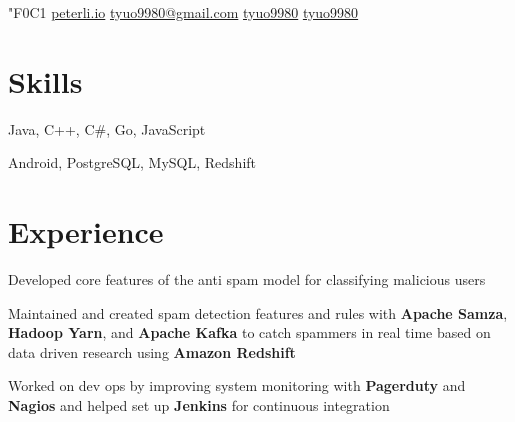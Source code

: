 \documentclass[]{peter_resume}
\begin{document}

{

   {\fa\char"F0C1} \href{http://peterli.io}{peterli.io}
     \href{mailto:tyuo9980@gmail.com}{tyuo9980@gmail.com}
     \href{https://github.com/tyuo9980}{tyuo9980}
     \href{https://www.linkedin.com/in/tyuo9980}{tyuo9980} 
}
\sectionsep
\vspace{0.3cm}

\begin{minipage}{\textwidth}


\section{Skills}
{\hfill Java, C++, C\#, Go, JavaScript}
\vspace{0.1cm}

{\hfill Android, PostgreSQL, MySQL, Redshift}
\sectionsep


\section{Experience}
\vspace{\topsep} %
\begin{tightemize}
\item Developed core features of the anti spam model for classifying malicious users
\item Maintained and created spam detection features and rules with \textbf{Apache Samza}, \textbf{Hadoop Yarn}, and \textbf{Apache Kafka} to catch spammers in real time based on data driven research using \textbf{Amazon Redshift}
\item Worked on dev ops by improving system monitoring with \textbf{Pagerduty} and \textbf{Nagios} and helped set up \textbf{Jenkins} for continuous integration
\end{tightemize}
\sectionsep


\end{minipage}
\end{document}
